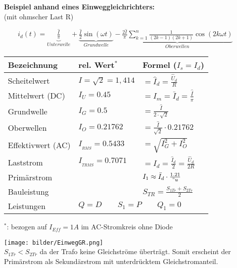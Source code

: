 	\begin{minipage}[c]{8cm} 
	   \textbf{Beispiel anhand eines Einweggleichrichters:}	  	\\
	   (mit ohmscher Last R) 
	\end{minipage}   
	\begin{minipage}[c]{10cm} 	
	   $ \qquad i_d(t) = \underbrace{\frac{\hat{I}}{\pi}}_{Unterwelle} + \underbrace{\frac{\hat{I}}{2}
	   \sin(\omega t)}_{Grundwelle} - \underbrace{\frac{2\hat{I}}{\pi} \sum\limits_{k=1}^n \frac{1}{(2k-1)(2k+1)} \cos(2k\omega t)}_{Oberwellen} $
	\end{minipage}   
		
	\begin{minipage}[c]{10cm}  
		\begin{tabular}{| l | l | l |}
    		\hline 
      		\textbf{Bezeichnung}
      		& \textbf{rel. Wert$^\ast$}
      		& \textbf{Formel} ($I_s = I_d$)\\
      		\hline
      		Scheitelwert
      		& $\hat{I} = \sqrt{2} = 1,414$
      		& $= \hat{I}_d = \frac{\hat{U}_d}{R} $ \\
      		Mittelwert (DC)
      		& $I_U = 0.45$
      		& $= I_m = \bar{I}_d = \frac{\hat{I}}{\pi}$ \\
      		Grundwelle
      		& $I_G = 0.5$
      		& $= \frac{\hat{I}}{2 \cdot \sqrt{2}}$ \\
      		Oberwellen
      		& $I_O = 0.21762$
      		& $= \frac{\hat{I}}{\sqrt{2}} \cdot 0.21762$ \\
      		Effektivwert (AC)
      		& $I_{_{RMS}} = 0.5433$
      		& $ = \sqrt{I_G^2 + I_O^2}$\\
      		Laststrom
      		& $I_{_{TRMS}} = 0.7071$
      		& $= I_{d} = \frac{\hat{I}_d}{2} =\frac{\hat{U}_d}{2 R}$ \\
      		Primärstrom
      		&
      		& $I_1 \approx \bar{I}_d \cdot \frac{1.21}{"u}$ \\
      		Bauleistung 
      		&
      		& $S_{TR} = \frac{S_{1Tr} + S_{2Tr}}{2}$ \\
      		\cline{2-3}
			Leistungen
		 	& \multicolumn{2}{l|}{ $Q = D \qquad S_1 = P \qquad Q_1 = 0$} \\
      		\hline 
    	\end{tabular} \newline
    	$^\ast$: bezogen auf $I_{Eff} = 1A$ im AC-Stromkreis ohne Diode
	\end{minipage}   
	\begin{minipage}[c]{8cm}  
			\texttt{[image: bilder/EinwegGR.png]}  \\			
	$S_{1Tr} < S_{2Tr}$ da der Trafo keine Gleichstr\"ome übertr\"agt. Somit erscheint der Prim\"arstrom
	als Sekund\"arstrom mit unterdrücktem Gleichstromanteil.\\			
	\end{minipage}

